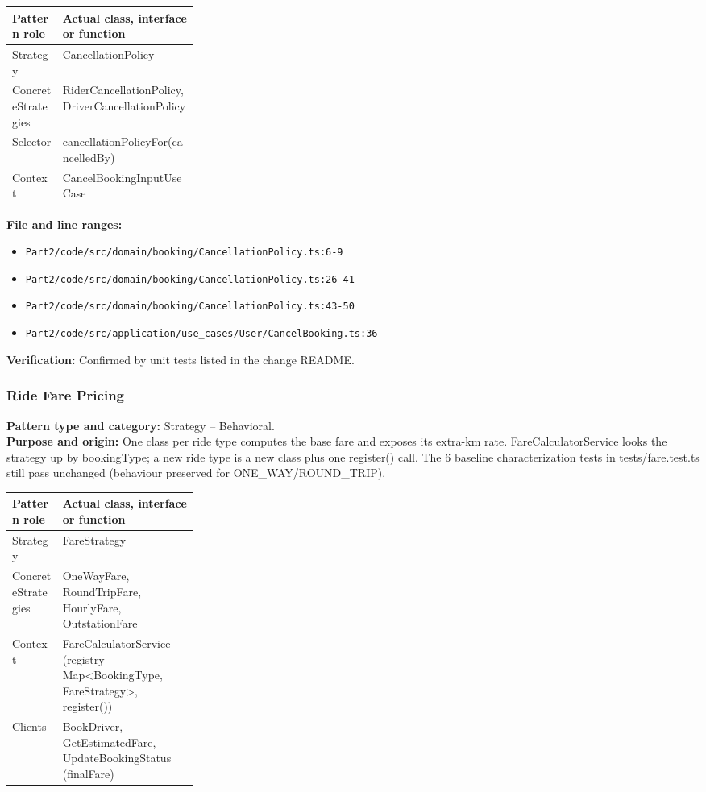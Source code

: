 \documentclass[11pt,a4paper]{article}
\begin{document}
\noindent\begin{tabularx}{\linewidth}{@{}P{0.27\linewidth}Y@{}}
\toprule Pattern role & Actual class, interface or function \\ \midrule
Strategy & CancellationPolicy \\
ConcreteStrategies & RiderCancellationPolicy, DriverCancellationPolicy \\
Selector & cancellationPolicyFor(cancelledBy) \\
Context & CancelBookingInputUseCase \\
\bottomrule
\end{tabularx}

\noindent\textbf{File and line ranges:}\begin{itemize}\setlength\itemsep{0pt}\item \texttt{Part2/\allowbreak{}code/\allowbreak{}src/\allowbreak{}domain/\allowbreak{}booking/\allowbreak{}CancellationPolicy.\allowbreak{}ts:6-9}\item \texttt{Part2/\allowbreak{}code/\allowbreak{}src/\allowbreak{}domain/\allowbreak{}booking/\allowbreak{}CancellationPolicy.\allowbreak{}ts:26-41}\item \texttt{Part2/\allowbreak{}code/\allowbreak{}src/\allowbreak{}domain/\allowbreak{}booking/\allowbreak{}CancellationPolicy.\allowbreak{}ts:43-50}\item \texttt{Part2/\allowbreak{}code/\allowbreak{}src/\allowbreak{}application/\allowbreak{}use\_\allowbreak{}cases/\allowbreak{}User/\allowbreak{}CancelBooking.\allowbreak{}ts:36}\end{itemize}
\noindent\textbf{Verification:} Confirmed by unit tests listed in the change README.

\subsubsection*{Ride Fare Pricing}
\textbf{Pattern type and category:} Strategy -- Behavioral.\\
\textbf{Purpose and origin:} One class per ride type computes the base fare and exposes its extra-km rate. FareCalculatorService looks the strategy up by bookingType; a new ride type is a new class plus one register() call. The 6 baseline characterization tests in tests/fare.test.ts still pass unchanged (behaviour preserved for ONE\_WAY/ROUND\_TRIP).

\noindent\begin{tabularx}{\linewidth}{@{}P{0.27\linewidth}Y@{}}
\toprule Pattern role & Actual class, interface or function \\ \midrule
Strategy & FareStrategy \\
ConcreteStrategies & OneWayFare, RoundTripFare, HourlyFare, OutstationFare \\
Context & FareCalculatorService (registry Map\textless{}BookingType, FareStrategy\textgreater{}, register()) \\
Clients & BookDriver, GetEstimatedFare, UpdateBookingStatus (finalFare) \\
\bottomrule
\end{tabularx}
\end{document}
